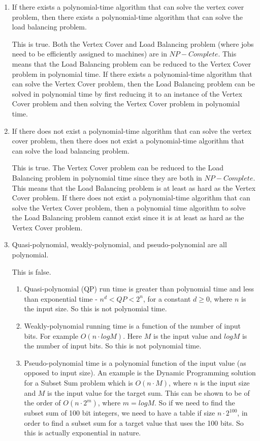 \documentclass[paper=a4, fontsize=11pt]{scrartcl} %
\numberwithin{figure}{section} %
\numberwithin{table}{section} %
\begin{document}
\begin{enumerate}
\begin{enumerate}
\item If there exists a polynomial-time algorithm that can solve the vertex cover problem, then there exists a polynomial-time algorithm that can solve the load balancing problem.

This is true. Both the Vertex Cover and Load Balancing problem (where jobs need to be efficiently assigned to machines) are in $NP-Complete$. This means that the Load Balancing problem can be reduced to the Vertex Cover problem in polynomial time.  If there exists a polynomial-time algorithm that can solve the Vertex Cover problem, then the Load Balancing problem can be solved in polynomial time by first reducing it to an instance of the Vertex Cover problem and then solving the Vertex Cover problem in polynomial time.

\item If there does not exist a polynomial-time algorithm that can solve the vertex cover problem, then there does not exist a polynomial-time algorithm that can solve the load balancing problem.

This is true. The Vertex Cover problem can be reduced to the Load Balancing problem in polynomial time since they are both in $NP-Complete$. This means that the Load Balancing problem is at least as hard as the Vertex Cover problem. If there does not exist a polynomial-time algorithm that can solve the Vertex Cover problem, then a polynomial time algorithm to solve the Load Balancing problem cannot exist since it is at least as hard as the Vertex Cover problem.

\item Quasi-polynomial, weakly-polynomial, and pseudo-polynomial are all polynomial.

This is false.

\begin{enumerate}

\item Quasi-polynomial (QP) run time is greater than polynomial time and less than exponential time - $n^d < QP < 2^n$, for a constant $d \geq 0$, where $n$ is the input size. So this is not polynomial time.

\item Weakly-polynomial running time is a function of the number of input bits. For example $O(n \cdot log M)$. Here $M$ is the input value and $log M$ is the number of input bits. So this is not polynomial time.

\item Pseudo-polynomial time is a polynomial function of the input value (as opposed to input size). An example is the Dynamic Programming solution for a Subset Sum problem which is $O(n \cdot M)$, where $n$ is the input size and $M$ is the input value for the target sum. This can be shown to be of the order of $O(n \cdot 2^m)$, where $m=log M$. So if we need to find the subset sum of 100 bit integers, we need to have a table if size $n \cdot 2^{100}$, in order to find a subset sum for a target value that uses the 100 bits. So this is actually exponential in nature.


\end{enumerate}
\end{enumerate}
\end{enumerate}
\end{document}
